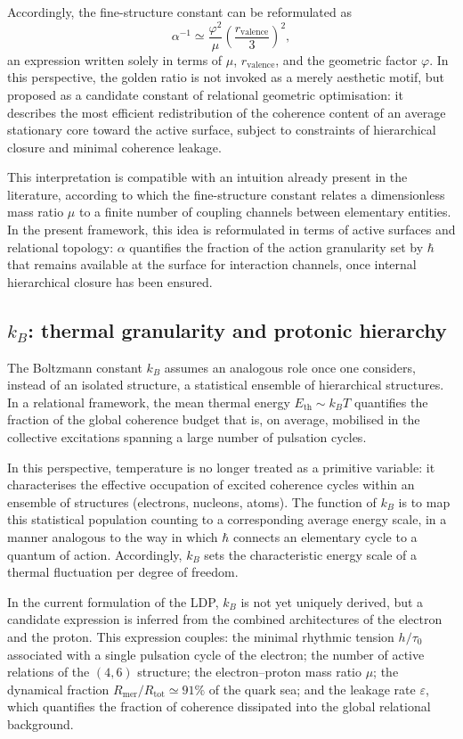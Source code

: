 \documentclass[11pt,a4paper]{article}
\begin{document}
Accordingly, the fine-structure constant can be reformulated as
\[
\alpha^{-1} \simeq \frac{\varphi^{2}}{\mu} \left(\frac{r_{\mathrm{valence}}}{3}\right)^{2},
\]
an expression written solely in terms of \(\mu\), \(r_{\mathrm{valence}}\), and the geometric factor \(\varphi\). In this perspective, the golden ratio is not invoked as a merely aesthetic motif, but proposed as a candidate constant of relational geometric optimisation: it describes the most efficient redistribution of the coherence content of an average stationary core toward the active surface, subject to constraints of hierarchical closure and minimal coherence leakage. 

This interpretation is compatible with an intuition already present in the literature, according to which the fine-structure constant relates a dimensionless mass ratio \(\mu\) to a finite number of coupling channels between elementary entities. In the present framework, this idea is reformulated in terms of active surfaces and relational topology: \(\alpha\) quantifies the fraction of the action granularity set by \(\hbar\) that remains available at the surface for interaction channels, once internal hierarchical closure has been ensured.

\subsection{\texorpdfstring{\(k_{B}\)}{kB}: thermal granularity and protonic hierarchy}
The Boltzmann constant \(k_{B}\) assumes an analogous role once one considers, instead of an isolated structure, a statistical ensemble of hierarchical structures. In a relational framework, the mean thermal energy \(E_{\mathrm{th}} \sim k_{B} T\) quantifies the fraction of the global coherence budget that is, on average, mobilised in the collective excitations spanning a large number of pulsation cycles. 

In this perspective, temperature is no longer treated as a primitive variable: it characterises the effective occupation of excited coherence cycles within an ensemble of structures (electrons, nucleons, atoms). The function of \(k_{B}\) is to map this statistical population counting to a corresponding average energy scale, in a manner analogous to the way in which \(\hbar\) connects an elementary cycle to a quantum of action. Accordingly, \(k_{B}\) sets the characteristic energy scale of a thermal fluctuation per degree of freedom. 

In the current formulation of the LDP, \(k_{B}\) is not yet uniquely derived, but a candidate expression is inferred from the combined architectures of the electron and the proton. This expression couples: the minimal rhythmic tension \(h/\tau_{0}\) associated with a single pulsation cycle of the electron; the number of active relations of the \((4,6)\) structure; the electron–proton mass ratio \(\mu\); the dynamical fraction \(R_{\mathrm{mer}}/R_{\mathrm{tot}} \simeq 91\%\) of the quark sea; and the leakage rate \(\varepsilon\), which quantifies the fraction of coherence dissipated into the global relational background. 
\end{document}
